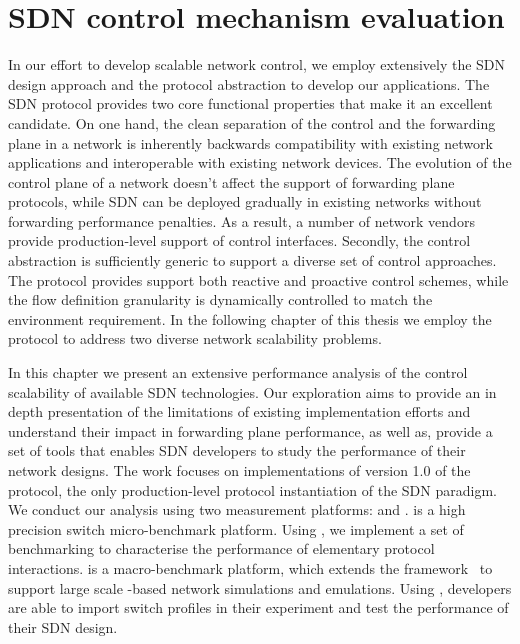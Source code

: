 \chapter{SDN control mechanism evaluation}
\ifpdf
    \graphicspath{{Chapter1/Chapter1Figs/PNG/}{Chapter1/Chapter1Figs/PDF/}{Chapter1/Chapter1Figs/}}
\else
    \graphicspath{{Chapter1/Chapter1Figs/EPS/}{Chapter1/Chapter1Figs/}}
\fi

In our effort to develop scalable network control, we employ extensively the SDN
design approach and the \of protocol abstraction to develop our applications.
The SDN protocol provides two core functional properties that make it an
excellent candidate.  On one hand, the clean separation of the control and the
forwarding plane in a network is inherently backwards compatibility with
existing network applications and interoperable with existing network devices.
The evolution of the control plane of a network doesn't affect the support of
forwarding plane protocols, while SDN can be deployed gradually in existing
networks without forwarding performance penalties. As a result, a number of
network vendors provide production-level support of \of control interfaces.
Secondly, the \of control abstraction is sufficiently generic to support a
diverse set of control approaches. The protocol provides support both reactive
and proactive control schemes, while the flow definition granularity is
dynamically controlled to match the environment requirement. In the following
chapter of this thesis we employ the \of protocol to address
two diverse network scalability problems. 

In this chapter we present an extensive performance analysis of the control
scalability of available SDN technologies. Our exploration aims to provide an in
depth presentation of the limitations of existing implementation efforts and
understand their impact in forwarding plane performance, as well as, provide a
set of tools that enables SDN developers to study the performance of their
network designs. The work focuses on implementations of version 1.0 of the \of
protocol, the only production-level protocol instantiation of the SDN paradigm.
We conduct our analysis using two measurement platforms: \oflops and \sdnsim.
\oflops is a high precision \of switch micro-benchmark platform. Using \oflops,
we implement a set of benchmarking to characterise the performance of elementary
\of protocol interactions. \sdnsim is a macro-benchmark \of
platform, which extends the \Unik framework~\cite{madhavapeddy2013} to
support large scale \of-based network simulations and emulations.
Using \sdnsim, developers are able to import \oflops switch profiles in their
experiment and test the performance of their SDN design.


